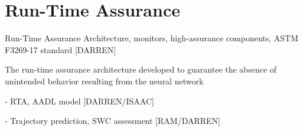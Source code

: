 \section{Run-Time Assurance}

Run-Time Assurance Architecture, monitors, high-assurance components, ASTM F3269-17 standard [DARREN]

The run-time assurance architecture developed to guarantee the absence of unintended behavior resulting from the neural network

- RTA, AADL model [DARREN/ISAAC]

- Trajectory prediction, SWC assessment [RAM/DARREN]
